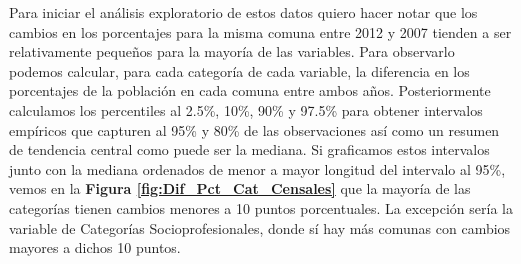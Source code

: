 \begin{table}[h]
\centering
{}
\caption{Variables censales a utilizar en el análisis.}
\label{tbl:Variables_Censales}
\end{table}

Para iniciar el análisis exploratorio de estos datos quiero hacer notar que los cambios en los porcentajes para la misma comuna entre 2012 y 2007 tienden a ser relativamente pequeños para la mayoría de las variables. Para observarlo podemos calcular, para cada categoría de cada variable, la diferencia en los porcentajes de la población en cada comuna entre ambos años. Posteriormente calculamos los percentiles al 2.5\%, 10\%, 90\% y 97.5\% para obtener intervalos empíricos que capturen al 95\% y 80\% de las observaciones así como un resumen de tendencia central como puede ser la mediana. Si graficamos estos intervalos junto con la mediana ordenados de menor a mayor longitud del intervalo al 95\%, vemos en la \textbf{Figura \ref{fig:Dif_Pct_Cat_Censales}} que la mayoría de las categorías tienen cambios menores a 10 puntos porcentuales. La excepción sería la variable de Categorías Socioprofesionales, donde sí hay más comunas con cambios mayores a dichos 10 puntos.\\ 

